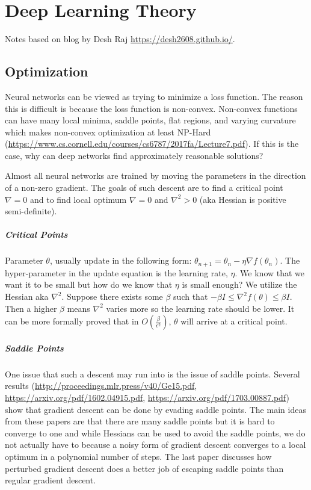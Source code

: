 \chapter{Deep Learning Theory}
Notes based on blog by Desh Raj  \url{https://desh2608.github.io/}.

\section{Optimization}
Neural networks can be viewed as trying to minimize a loss function. The reason this is difficult is because the loss function is non-convex. Non-convex functions can have many local minima, saddle points, flat regions, and varying curvature which makes non-convex optimization at least NP-Hard (\url{https://www.cs.cornell.edu/courses/cs6787/2017fa/Lecture7.pdf}). If this is the case, why can deep networks find approximately reasonable solutions?

Almost all neural networks are trained by moving the parameters in the direction of a non-zero gradient. The goals of such descent are to find a critical point $\nabla =0$ and to find local optimum $\nabla =0$ and $\nabla^{2} >0$ (aka Hessian is positive semi-definite). 

\paragraph{Critical Points}
Parameter $\theta$, usually update in the following form: $\theta_{n+1} = \theta_{n} - \eta \nabla f(\theta_n)$. The hyper-parameter in the update equation is the learning rate, $\eta$. We know that we want it to be small but how do we know that $\eta$ is small enough? We utilize the Hessian aka $\nabla^2$. Suppose there exists some $\beta$ such that $-\beta I \leq \nabla^2 f(\theta) \leq \beta I$. Then a higher $\beta$ means $\nabla^2$ varies more so the learning rate should be lower. It can be more formally proved that in $O(\frac{\beta}{\epsilon^2})$, $\theta$ will arrive at a critical point.

\paragraph{Saddle Points}
One issue that such a descent may run into is the issue of saddle points. Several results (\url{http://proceedings.mlr.press/v40/Ge15.pdf}, \url{https://arxiv.org/pdf/1602.04915.pdf}, \url{https://arxiv.org/pdf/1703.00887.pdf}) show that gradient descent can be done by evading saddle points. The main ideas from these papers are that there are many saddle points but it is hard to converge to one and while Hessians can be used to avoid the saddle points, we do not actually have to because a noisy form of gradient descent converges to a local optimum in a polynomial number of steps. The last paper discusses how perturbed gradient descent does a better job of escaping saddle points than regular gradient descent. 

